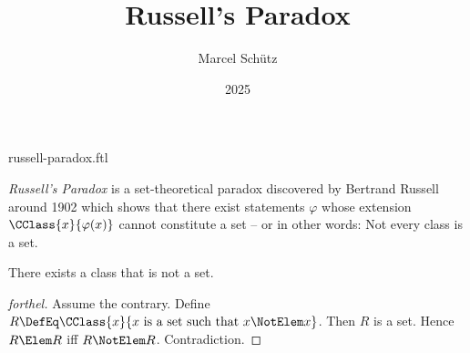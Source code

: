 \documentclass{stex}
\title{Russell's Paradox}
\author{Marcel Schütz}
\date{2025}
\begin{document}
\begin{smodule}{russell-paradox.ftl}



\maketitle

\noindent \emph{Russell's Paradox} is a set-theoretical paradox discovered by
Bertrand Russell around 1902 \cite[chapter XV]{Frege1980} which shows that 
there exist statements $\varphi$ whose extension
$\CClass{x}{\varphi(x)}$ cannot constitute a set -- or in other words:
Not every class is a set.

\begin{forthel}
  \begin{theorem}[title=Russell's Paradox,name=Russell Paradox]
    There exists a class that is not a set.
  \end{theorem}
  \begin{proof}[forthel]
    Assume the contrary.
    Define $R \DefEq \CClass{x}{x \text{ is a set such that } x \NotElem x}$.
    Then $R$ is a set.
    Hence $R \Elem R$ iff $R \NotElem R$.
    Contradiction.
  \end{proof}
\end{forthel}

\printbibliography
{}

\end{smodule}
\end{document}
